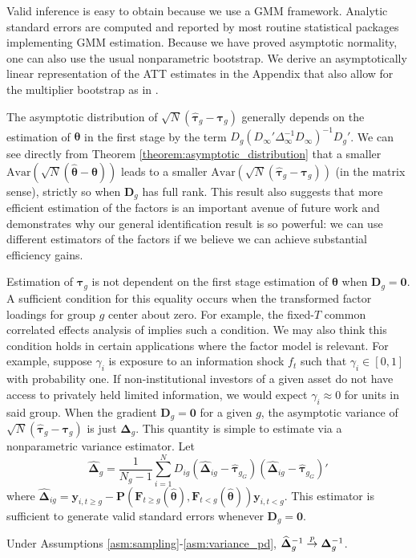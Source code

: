 \documentclass[12pt]{article}
\begin{document}
Valid inference is easy to obtain because we use a GMM framework. Analytic standard errors are computed and reported by most routine statistical packages implementing GMM estimation. Because we have proved asymptotic normality, one can also use the usual nonparametric bootstrap. We derive an asymptotically linear representation of the ATT estimates in the Appendix that also allow for the multiplier bootstrap as in \citet{Callaway_Karami_2020}. 

The asymptotic distribution of $\sqrt{N}(\widehat{\bm \tau}_g - \bm \tau_{g})$ generally depends on the estimation of $\bm \theta$ in the first stage by the term $D_g (D_\infty' \Delta_\infty^{-1} D_\infty)^{-1} D_g'$. We can see directly from Theorem \ref{theorem:asymptotic_distribution} that a smaller $\text{Avar}(\sqrt{N}(\widehat{\bm \theta} - \bm \theta))$ leads to a smaller $\text{Avar}(\sqrt{N}(\widehat{\bm \tau}_g - \bm \tau_g))$ (in the matrix sense), strictly so when $\bm D_g$ has full rank. This result also suggests that more efficient estimation of the factors is an important avenue of future work and demonstrates why our general identification result is so powerful: we can use different estimators of the factors if we believe we can achieve substantial efficiency gains. 

Estimation of $\bm \tau_g$ is not dependent on the first stage estimation of $\bm \theta$ when $\bm D_g = \bm 0$. A sufficient condition for this equality occurs when the transformed factor loadings for group $g$ center about zero. For example, the fixed-$T$ common correlated effects analysis of \citet{Westerlund_Petrova_Norkute_2019} implies such a condition. We may also think this condition holds in certain applications where the factor model is relevant. For example, suppose $\gamma_i$ is exposure to an information shock $f_t$ such that $\gamma_i \in [0,1]$ with probability one. If non-institutional investors of a given asset do not have access to privately held limited information, we would expect $\gamma_i \approx 0$ for units in said group. When the gradient $\bm D_g = \bm 0$ for a given $g$, the asymptotic variance of $\sqrt{N}(\widehat{\bm \tau}_g - \bm \tau_g)$ is just $\bm \Delta_g$. This quantity is simple to estimate via a nonparametric variance estimator. Let 
\begin{equation}\label{eq:nonparametric_variance}
  \widehat{\bm \Delta}_g = \frac{1}{N_g - 1} \sum_{i = 1}^N D_{ig} \left( \widehat{\bm \Delta}_{ig} - \widehat{\bm \tau}_{g_G} \right) \left( \widehat{\bm \Delta}_{ig} - \widehat{\bm \tau}_{g_G} \right)'
\end{equation}
where $\widehat{\bm \Delta}_{ig} = \bm y_{i, t \geq g} - \bm P(\bm F_{t \geq g}(\widehat{\bm \theta}), \bm F_{t < g}(\widehat{\bm \theta})) \bm y_{i, t < g}$. This estimator is sufficient to generate valid standard errors whenever $\bm D_g = \bm 0$.
\begin{theorem}\label{theorem:nonparametric_variance}
  Under Assumptions \ref{asm:sampling}-\ref{asm:variance_pd}, $\widehat{\bm \Delta}_g^{-1} \stackrel{p}{\rightarrow} \bm \Delta_g^{-1}$.
\end{theorem}
\end{document}
